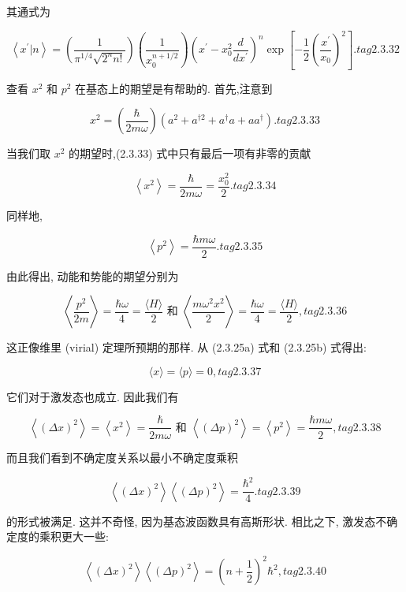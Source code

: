 \documentclass[lang=cn,newtx,10pt,scheme=chinese,thmcnt=section]{elegantbook}
\begin{document}
其通式为

$$
\left\langle {{x}^{\prime } | n}\right\rangle = \left( \frac{1}{{\pi }^{1/4}\sqrt{{2}^{n}n!}}\right) \left( \frac{1}{{x}_{0}^{n + 1/2}}\right) {\left( {x}^{\prime } - {x}_{0}^{2}\frac{d}{d{x}^{\prime }}\right) }^{n}\exp \left\lbrack {-\frac{1}{2}{\left( \frac{{x}^{\prime }}{{x}_{0}}\right) }^{2}}\right\rbrack . tag{2.3.32}
$$

查看 ${x}^{2}$ 和 ${p}^{2}$ 在基态上的期望是有帮助的. 首先,注意到

$$
{x}^{2} = \left( \frac{\hbar }{2m\omega }\right) \left( {{a}^{2} + {a}^{\dagger 2} + {a}^{ \dagger }a + a{a}^{ \dagger }}\right) . tag{2.3.33}
$$

当我们取 ${x}^{2}$ 的期望时,(2.3.33) 式中只有最后一项有非零的贡献

$$
\left\langle {x}^{2}\right\rangle = \frac{\hbar }{2m\omega } = \frac{{x}_{0}^{2}}{2}. tag{2.3.34}
$$

同样地,

$$
\left\langle {p}^{2}\right\rangle = \frac{\hbar {m\omega }}{2}. tag{2.3.35}
$$

由此得出, 动能和势能的期望分别为

$$
\left\langle \frac{{p}^{2}}{2m}\right\rangle = \frac{\hbar \omega }{4} = \frac{\langle H\rangle }{2}\text{ 和 }\left\langle \frac{m{\omega }^{2}{x}^{2}}{2}\right\rangle = \frac{\hbar \omega }{4} = \frac{\langle H\rangle }{2}, tag{2.3.36}
$$

这正像维里 (virial) 定理所预期的那样. 从 (2.3.25a) 式和 (2.3.25b) 式得出:

$$
\langle x\rangle = \langle p\rangle = 0, tag{2.3.37}
$$

它们对于激发态也成立. 因此我们有

$$
\left\langle {\left( \Delta x\right) }^{2}\right\rangle = \left\langle {x}^{2}\right\rangle = \frac{\hbar }{2m\omega }\text{ 和 }\left\langle {\left( \Delta p\right) }^{2}\right\rangle = \left\langle {p}^{2}\right\rangle = \frac{\hbar {m\omega }}{2}, tag{2. 3.38}
$$

而且我们看到不确定度关系以最小不确定度乘积

$$
\left\langle {\left( \Delta x\right) }^{2}\right\rangle \left\langle {\left( \Delta p\right) }^{2}\right\rangle = \frac{{\hbar }^{2}}{4}. tag{2.3.39}
$$

的形式被满足. 这并不奇怪, 因为基态波函数具有高斯形状. 相比之下, 激发态不确定度的乘积更大一些:

$$
\left\langle {\left( \Delta x\right) }^{2}\right\rangle \left\langle {\left( \Delta p\right) }^{2}\right\rangle = {\left( n + \frac{1}{2}\right) }^{2}{\hbar }^{2}, tag{2.3.40}
$$
\end{document}

